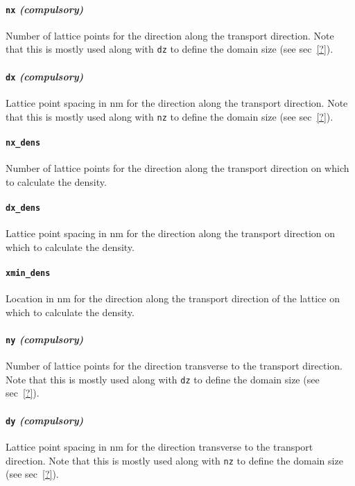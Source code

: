 \documentclass[12pt]{article}
\begin{document}
\paragraph{\texttt{nx} \emph{(compulsory)}}
Number of lattice points for the direction along the transport direction.  Note
that this is mostly used along with \texttt{dz} to define the domain size (see sec~\ref{?}).

\paragraph{\texttt{dx} \emph{(compulsory)}}
Lattice point spacing in nm for the direction along the transport direction.
Note that this is mostly used along with \texttt{nz} to define the domain size (see
sec~\ref{?}).

\paragraph{\texttt{nx\_dens}}
Number of lattice points for the direction along the transport direction on which
to calculate the density.

\paragraph{\texttt{dx\_dens}}
Lattice point spacing in nm for the direction along the transport direction on
which to calculate the density.

\paragraph{\texttt{xmin\_dens}}
Location in nm for the direction along the transport direction of the lattice on
which to calculate the density.

\paragraph{\texttt{ny} \emph{(compulsory)}}
Number of lattice points for the direction transverse to the transport direction.  Note
that this is mostly used along with \texttt{dz} to define the domain size (see sec~\ref{?}).

\paragraph{\texttt{dy} \emph{(compulsory)}}
Lattice point spacing in nm for the direction transverse to the transport direction.
Note that this is mostly used along with \texttt{nz} to define the domain size (see
sec~\ref{?}).
\end{document}
